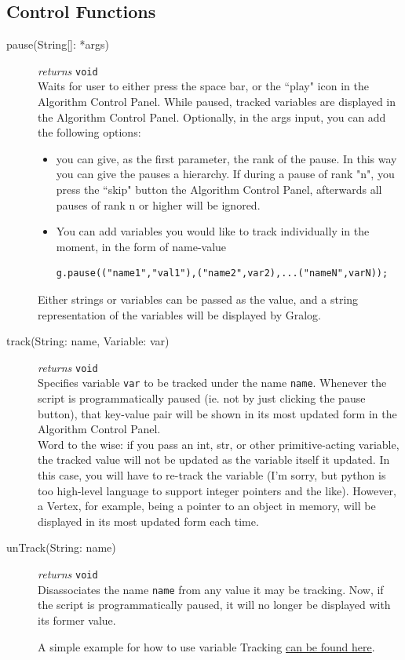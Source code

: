 \subsection{Control Functions}
\begin{description}


\item[pause(String{[]}: *args)]\emph{returns}
  \texttt{void}\\
Waits for user to either press the space bar, or the ``play" icon in the Algorithm Control Panel. While paused, tracked variables are displayed in the Algorithm Control Panel. Optionally, in the args input, you can add the following options:
\begin{itemize}
    \item you can give, as the first parameter, the rank of the pause. In this way you can give the pauses a hierarchy. If during a pause of rank "n", you press the ``skip" button the Algorithm Control Panel, afterwards all pauses of rank n or higher will be ignored.
    \item You can add variables you would like to track individually in the moment, in the form of name-value \begin{lstlisting}
g.pause(("name1","val1"),("name2",var2),...("nameN",varN));
\end{lstlisting}
\end{itemize}

Either strings or variables can be passed as the value, and a string representation of the variables will be displayed by Gralog.

\item[track(String: name, Variable: var)]\emph{returns}
  \texttt{void}\\
Specifies variable \texttt{var} to be tracked under the name \texttt{name}. Whenever the script is programmatically paused (ie. not by just clicking the pause button), that key-value pair will be shown in its most updated form in the Algorithm Control Panel.\\

Word to the wise: if you pass an int, str, or other primitive-acting variable, the tracked value will not be updated as the variable itself it updated. In this case, you will have to re-track the variable (I'm sorry, but python is too high-level language to support integer pointers and the like). However, a Vertex, for example, being a pointer to an object in memory, will be displayed in its most updated form each time.


\item[unTrack(String: name)]\emph{returns}
  \texttt{void}\\
Disassociates the name \texttt{name} from any value it may be tracking. Now, if the script is programmatically paused, it will no longer be displayed with its former value.




A simple example for how to use variable Tracking \hyperref[varTrackingExample]{can be found here}.

\end{description}


